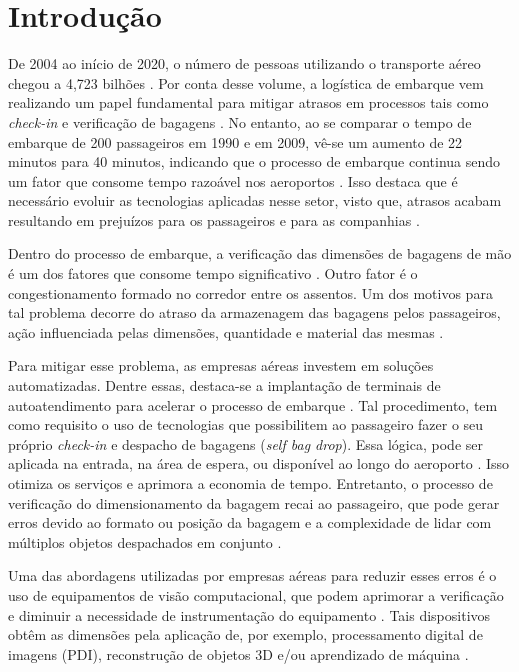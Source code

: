 %
\chapter[Introdução]{Introdução}
\label{cap_intro}
De 2004 ao início de 2020, o número de pessoas utilizando o transporte aéreo chegou a 4,723 bilhões \cite{statista_2020_airline,icao_2019_the}. Por conta desse volume, a logística de embarque vem realizando um papel fundamental para mitigar atrasos em processos tais como \textit{check-in} e verificação de bagagens \cite{gao_2021_airline}. No entanto, ao se comparar o tempo de embarque de 200 passageiros em 1990 e em 2009, vê-se um aumento de 22 minutos para 40 minutos, indicando que o processo de embarque continua sendo um fator que consome tempo razoável nos aeroportos \cite{ren_2020_a}. Isso destaca que é necessário evoluir as tecnologias aplicadas nesse setor, visto que, atrasos acabam resultando em prejuízos para os passageiros e para as companhias \cite{ren_2020_a, unitedairlines_2020_checkin, qingji_2018_method,gao_2018_minimum}. 

Dentro do processo de embarque, a verificação das dimensões de bagagens de mão é um dos fatores que consome tempo significativo \cite{ronzani_2015_impact, negri_2017_avaliao}. Outro fator é o congestionamento formado no corredor entre os assentos. Um dos motivos para tal problema decorre do atraso da armazenagem das bagagens pelos passageiros, ação influenciada pelas dimensões, quantidade e material das mesmas \cite{ren_2020_a}.

Para mitigar esse problema, as empresas aéreas investem em soluções automatizadas. Dentre essas, destaca-se a implantação de terminais de autoatendimento para acelerar o processo de embarque \cite{colby_2019_selfservice, ren_2020_a}. Tal procedimento, tem como requisito o uso de tecnologias que possibilitem ao passageiro fazer o seu próprio \textit{check-in} e despacho de bagagens (\textit{self bag drop}). Essa lógica, pode ser aplicada na entrada, na área de espera, ou disponível ao longo do aeroporto \cite{alsyouf_2018_improving}. Isso otimiza os serviços e aprimora a economia de tempo. Entretanto, o processo de verificação do dimensionamento da bagagem recai ao passageiro, que pode gerar erros devido ao formato ou posição da bagagem e a complexidade de lidar com múltiplos objetos despachados em conjunto \cite{colby_2019_selfservice, ren_2020_a}. 

Uma das abordagens utilizadas por empresas aéreas para reduzir esses erros é o uso de equipamentos de visão computacional, que podem aprimorar a verificação e diminuir a necessidade de instrumentação do equipamento \cite{anderson_2019_singapore, humphries_2019_newark, kucuk_2019_development,gmen_2021_smart}. Tais dispositivos obtêm as dimensões pela aplicação de, por exemplo, processamento digital de imagens (PDI), reconstrução de objetos 3D e/ou aprendizado de máquina \cite{zhang_2018_a}. 

